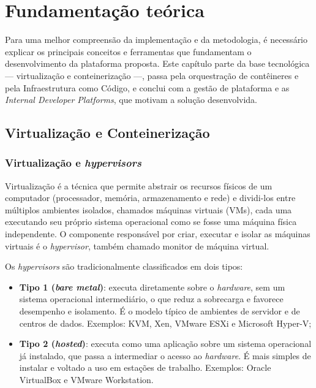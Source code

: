 \chapter{Fundamentação teórica}
\label{chapter:fundamentacao_teorica}

Para uma melhor compreensão da implementação e da metodologia, é necessário explicar os principais conceitos e ferramentas que fundamentam o desenvolvimento da plataforma proposta. Este capítulo parte da base tecnológica — virtualização e conteinerização —, passa pela orquestração de contêineres e pela Infraestrutura como Código, e conclui com a gestão de plataforma e as \textit{Internal Developer Platforms}, que motivam a solução desenvolvida.


\section{Virtualização e Conteinerização}
\label{sec:virtualizacao_conteinerizacao}

\subsection{Virtualização e \textit{hypervisors}}

\par Virtualização é a técnica que permite abstrair os recursos físicos de um computador (processador, memória, armazenamento e rede) e dividi-los entre múltiplos ambientes isolados, chamados máquinas virtuais (VMs), cada uma executando seu próprio sistema operacional como se fosse uma máquina física independente. O componente responsável por criar, executar e isolar as máquinas virtuais é o \textit{hypervisor}, também chamado monitor de máquina virtual.\\
\par Os \textit{hypervisors} são tradicionalmente classificados em dois tipos:
\begin{itemize}
    \item \textbf{Tipo 1 (\textit{bare metal})}: executa diretamente sobre o \textit{hardware}, sem um sistema operacional intermediário, o que reduz a sobrecarga e favorece desempenho e isolamento. É o modelo típico de ambientes de servidor e de centros de dados. Exemplos: KVM, Xen, VMware ESXi e Microsoft Hyper-V;
    \item \textbf{Tipo 2 (\textit{hosted})}: executa como uma aplicação sobre um sistema operacional já instalado, que passa a intermediar o acesso ao \textit{hardware}. É mais simples de instalar e voltado a uso em estações de trabalho. Exemplos: Oracle VirtualBox e VMware Workstation.
\end{itemize}

